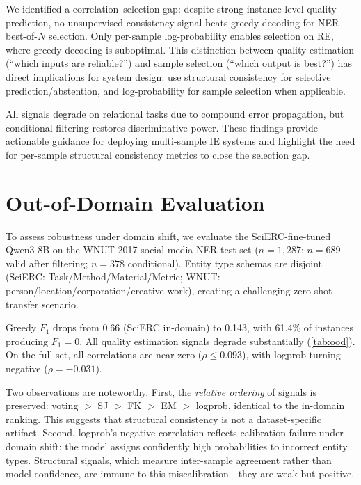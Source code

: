 \documentclass[11pt]{article}
\begin{document}
We identified a correlation--selection gap: despite strong instance-level quality prediction, no unsupervised consistency signal beats greedy decoding for NER best-of-$N$ selection.
Only per-sample log-probability enables selection on RE, where greedy decoding is suboptimal.
This distinction between quality estimation (``which inputs are reliable?'') and sample selection (``which output is best?'') has direct implications for system design: use structural consistency for selective prediction/abstention, and log-probability for sample selection when applicable.

All signals degrade on relational tasks due to compound error propagation, but conditional filtering restores discriminative power.
These findings provide actionable guidance for deploying multi-sample IE systems and highlight the need for per-sample structural consistency metrics to close the selection gap.

\appendix
\section{Out-of-Domain Evaluation}
\label{sec:ood}

To assess robustness under domain shift, we evaluate the SciERC-fine-tuned Qwen3-8B on the WNUT-2017 social media NER test set ($n{=}1{,}287$; $n{=}689$ valid after filtering; $n{=}378$ conditional).
Entity type schemas are disjoint (SciERC: Task/Method/Material/Metric; WNUT: person/location/corporation/creative-work), creating a challenging zero-shot transfer scenario.

Greedy $F_1$ drops from 0.66 (SciERC in-domain) to 0.143, with 61.4\% of instances producing $F_1{=}0$.
All quality estimation signals degrade substantially (\cref{tab:ood}).
On the full set, all correlations are near zero ($\rho \le 0.093$), with logprob turning negative ($\rho{=}{-}0.031$).

Two observations are noteworthy.
First, the \emph{relative ordering} of signals is preserved: voting $>$ SJ $>$ FK $>$ EM $>$ logprob, identical to the in-domain ranking.
This suggests that structural consistency is not a dataset-specific artifact.
Second, logprob's negative correlation reflects calibration failure under domain shift: the model assigns confidently high probabilities to incorrect entity types.
Structural signals, which measure inter-sample agreement rather than model confidence, are immune to this miscalibration---they are weak but positive.
\end{document}

